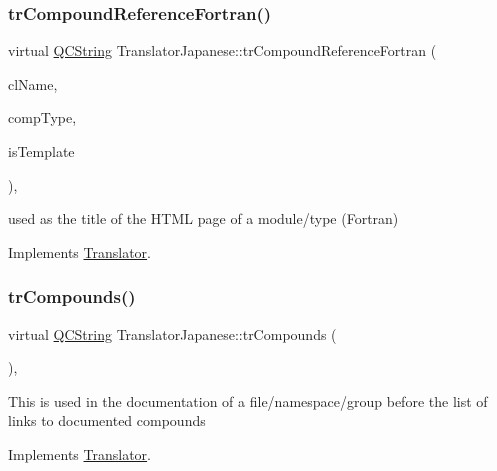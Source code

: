 \subsubsection{\texorpdfstring{trCompoundReferenceFortran()}{trCompoundReferenceFortran()}}
{\footnotesize\ttfamily virtual \mbox{\hyperlink{class_q_c_string}{Q\+C\+String}} Translator\+Japanese\+::tr\+Compound\+Reference\+Fortran (\begin{DoxyParamCaption}\item[{const char $\ast$}]{cl\+Name,  }\item[{\mbox{\hyperlink{class_class_def_ae70cf86d35fe954a94c566fbcfc87939}{Class\+Def\+::\+Compound\+Type}}}]{comp\+Type,  }\item[{bool}]{is\+Template }\end{DoxyParamCaption})\hspace{0.3cm}{\ttfamily [inline]}, {\ttfamily [virtual]}}

used as the title of the H\+T\+ML page of a module/type (Fortran) 

Implements \mbox{\hyperlink{class_translator}{Translator}}.

\mbox{\label{class_translator_japanese_a2b91fba77059169cea568e1304a1935a}} 
\subsubsection{\texorpdfstring{trCompounds()}{trCompounds()}}
{\footnotesize\ttfamily virtual \mbox{\hyperlink{class_q_c_string}{Q\+C\+String}} Translator\+Japanese\+::tr\+Compounds (\begin{DoxyParamCaption}{ }\end{DoxyParamCaption})\hspace{0.3cm}{\ttfamily [inline]}, {\ttfamily [virtual]}}

This is used in the documentation of a file/namespace/group before the list of links to documented compounds 

Implements \mbox{\hyperlink{class_translator}{Translator}}.

\mbox{\label{class_translator_japanese_ad998de92c4a5b3e261ba6cdf0e27e8a0}} 
